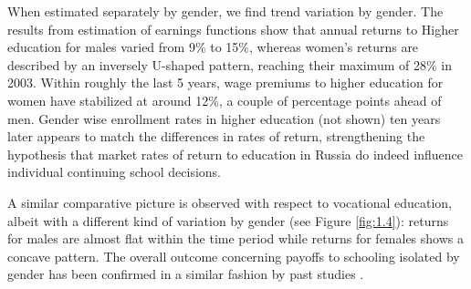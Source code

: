 \documentclass[alpha-refs]{wiley-article-01g}
\begin{document}
When estimated separately by gender, we find trend variation by gender. The results from estimation of earnings functions show that annual returns to Higher education for males varied from 9\% to 15\%, whereas women's returns are described by an inversely U-shaped pattern, reaching their maximum of 28\% in 2003. Within roughly the last 5 years, wage premiums to higher education for women have stabilized at around 12\%, a couple of percentage points ahead of men.  Gender wise enrollment rates in higher education (not shown) ten years later appears to match the differences in rates of return, strengthening the hypothesis that market rates of return to education in Russia do indeed influence individual continuing school decisions. 

A similar comparative picture is observed with respect to vocational education, albeit with a different kind of variation by gender (see Figure \ref{fig:1.4}): returns for males are almost flat within the time period while returns for females shows a concave pattern. The overall outcome concerning payoffs to schooling isolated by gender has been confirmed in a similar fashion by past studies \parencite[e.g.,][]{Cheidvasser2007}.
\end{document}
